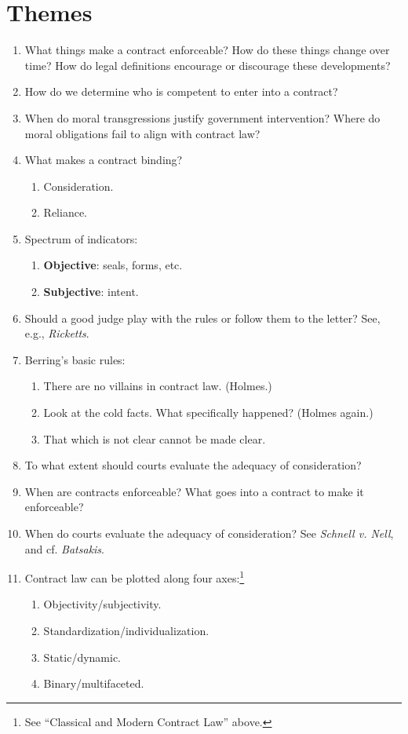 \section{Themes}

\begin{enumerate}
    \item What things make a contract enforceable? How do these things change 
    over time? How do legal definitions encourage or discourage these 
    developments?
    \item How do we determine who is competent to enter into a contract?
    \item When do moral transgressions justify government intervention? Where 
    do moral obligations fail to align with contract law?
    \item What makes a contract binding?
    \begin{enumerate}
        \item Consideration.
        \item Reliance.
    \end{enumerate}
    \item Spectrum of indicators:
    \begin{enumerate}
        \item \textbf{Objective}: seals, forms, etc.
        \item \textbf{Subjective}: intent.
    \end{enumerate}
    \item Should a good judge play with the rules or follow them to the 
    letter? See, e.g., \emph{Ricketts}.
    \item Berring's basic rules:
    \begin{enumerate}
        \item There are no villains in contract law. (Holmes.)
        \item Look at the cold facts. What specifically happened? (Holmes 
        again.)
        \item That which is not clear cannot be made clear.
    \end{enumerate}
    \item To what extent should courts evaluate the adequacy of consideration?
    \item When are contracts enforceable? What goes into a contract to make it 
    enforceable?
    \item When do courts evaluate the adequacy of consideration? See 
    \emph{Schnell v. Nell}, and cf. \emph{Batsakis}.
    \item Contract law can be plotted along four axes:\footnote{See 
    ``Classical and Modern Contract Law'' above.}
    \begin{enumerate}
        \item Objectivity/subjectivity.
        \item Standardization/individualization.
        \item Static/dynamic.
        \item Binary/multifaceted.
    \end{enumerate}
\end{enumerate}
